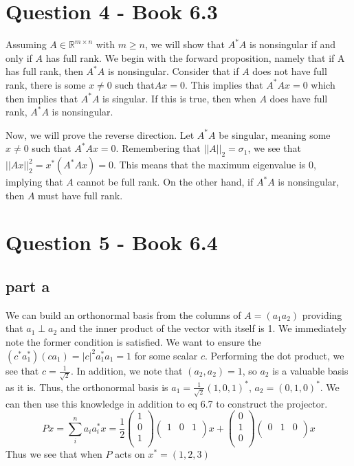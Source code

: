 \documentclass[a4paper,12pt]{article}
\begin{document}
\section{Question 4 - Book 6.3}
Assuming $A\in \mathbb{R}^{m\times n}$ with $m\geq n$, we will show that $A^*A$ is nonsingular if and only if $A$ has full rank. We begin with the forward proposition, namely that if A has full rank, then $A^*A$ is nonsingular. Consider that if $A$ does not have full rank, there is some $x\neq 0$ such that$Ax=0$. This implies that $A^*Ax=0$ which then implies that $A^*A$ is singular. If this is true, then when $A$ does have full rank, $A^*A$ is nonsingular. 


Now, we will prove the reverse direction. Let $A^*A$ be singular, meaning some $x\neq 0$ such that $A^*Ax=0$. Remembering that $||A||_2=\sigma_1$, we see that $||Ax||_2^2 =x^*(A^*Ax)=0$. This means that the maximum eigenvalue is 0, implying that $A$ cannot be full rank. On the other hand, if $A^*A$ is nonsingular, then $A$ must have full rank. 




\section{Question 5 - Book 6.4}
\subsection{part a}
We can build an orthonormal basis from the columns of $A=(a_1  a_2)$ providing that $a_1 \perp a_2$ and the inner product of the vector with itself is 1. We immediately note the former condition is satisfied. We want to ensure the $(c^* a_1^*)(ca_1) = |c|^2 a_1^*a_1=1$ for some scalar $c$. Performing the dot product, we see that $c=\frac{1}{\sqrt2}$. In addition, we note that $(a_2,a_2)=1$, so $a_2$ is a valuable basis as it is. Thus, the orthonormal basis is $a_1=\frac{1}{\sqrt2}(1,0,1)^*$, $a_2=(0,1,0)^*$. We can then use this knowledge in addition to eq 6.7 to construct the projector.
\begin{equation}
Px=\sum_i^n a_ia_i^* x = \frac{1}{2}\begin{pmatrix}
1\\
0\\
1\\ 
\end{pmatrix}
\begin{pmatrix}
1 & 0&1\\
\end{pmatrix}x +
\begin{pmatrix}
0\\
1\\
0\\ 
\end{pmatrix}
\begin{pmatrix}
0&1&0\\
\end{pmatrix}x
\end{equation} Thus we see that  when $P$ acts on $x^*=(1,2,3)$
\end{document}
